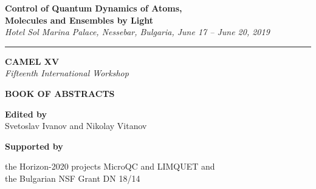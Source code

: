 \thispagestyle{empty}



\begin{center}

{\LARGE \textsf{\textbf{Control of Quantum Dynamics of Atoms,}\\ \vspace{2mm} \textbf{Molecules and Ensembles by Light} }}\\ \vspace{2mm}
\begingroup
    \fontsize{15pt}{12pt}\selectfont
    \emph{Hotel Sol Marina Palace, Nessebar, Bulgaria, June 17 -- June 20, 2019}
\endgroup

\vspace{3mm}

\hrule

\vspace{25mm}

{\fontsize{40}{48}\selectfont \textsf{\textbf{CAMEL XV}}}\\
\vspace{5mm}
{\LARGE \emph{Fifteenth International Workshop}}\\

\vspace{30mm}

{\fontsize{36}{40}\selectfont \textsf{\textbf{BOOK OF  ABSTRACTS}}}\\

\vspace{20mm}

\Large{\textbf{Edited by} \\ Svetoslav Ivanov and Nikolay Vitanov}

\vspace{55mm}

{\Large \textbf{Supported by}

the Horizon-2020 projects MicroQC and LIMQUET and\\
the Bulgarian NSF Grant DN 18/14

}




\end{center}

